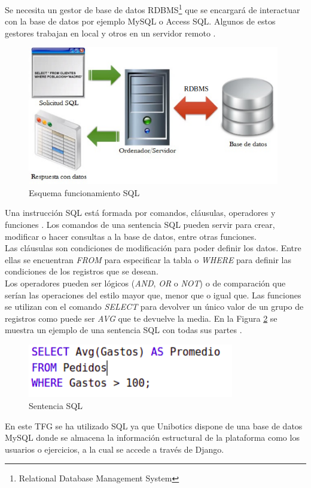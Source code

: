 Se necesita un gestor de base de datos RDBMS\footnote{Relational Database Management System}  que se encargará de interactuar con la base de datos por ejemplo MySQL o  Access SQL. Algunos de estos gestores trabajan en local y otros en un servidor remoto \cite{rdbms}.\\

\begin{figure}[H]
    \centering
    \includegraphics[width=11cm, keepaspectratio]{img/sql.png}
    \caption{Esquema funcionamiento SQL}
    \label{fig:sql}
\end{figure}
Una instrucción SQL está formada por comandos, cláusulas, operadores y funciones . Los comandos de una sentencia SQL pueden servir para crear, modificar o hacer consultas a la base de datos, entre otras funciones.\\

Las cláusulas son condiciones de modificación para poder definir los datos. Entre ellas se encuentran \textit{FROM} para especificar la tabla o \textit{WHERE} para definir las condiciones de los registros que se desean.\\

Los operadores pueden ser lógicos (\textit{AND}, \textit{OR} o \textit{NOT}) o de comparación que serían las operaciones del estilo mayor que, menor que o igual que. Las funciones se utilizan con el comando \textit{SELECT} para devolver un único valor de un grupo de registros como puede ser\textit{ AVG }que te devuelve la media. En la Figura \ref{fig:ejsql} se muestra un ejemplo de una sentencia SQL con todas sus partes \cite{sql}.\\

\begin{figure}[H]
    \centering
    \includegraphics[width=9cm, keepaspectratio]{img/ejsql.png}
    \caption{Sentencia SQL}
    \label{fig:ejsql}
\end{figure}
En este TFG se ha utilizado SQL ya que Unibotics dispone de una base de datos MySQL donde se almacena la información estructural de la plataforma como los usuarios o ejercicios, a la cual se accede a través de Django.

